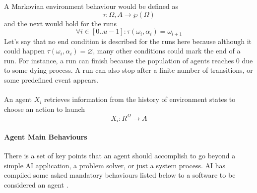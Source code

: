 \documentclass[11pt,oneside,a4paper,openright]{report}
\begin{document}
A Markovian environment behaviour would be defined as
\begin{equation}
	\tau : \Omega,A \longrightarrow \wp(\Omega)
\end{equation}
and the next would hold for the runs
\begin{equation} 
	\forall i \in [0..u-1] : \tau(\omega_i, \alpha_i) = \omega_{i+1}
\end{equation}
Let's say that no end condition is described for the runs here because although it could happen
$\tau(\omega_i, \alpha_i) = \varnothing$, many other conditions could mark the end of a run.
For instance, a run can finish because the population of agents reaches 0 due to some dying process.
A run can also stop after a finite number of transitions, or some predefined event appears.\\
\\
An agent $X_i$ retrieves information from the history of environment states to choose an action to launch
\begin{equation}
	X_i : R^{\Omega} \longrightarrow A 
\end{equation}


\paragraph{Agent Main Behaviours}

There is a set of key points that an agent should accomplish to go beyond a simple AI application, a problem solver, or just a system process. AI has compiled some asked mandatory behaviours listed below to a software to be considered an agent \cite[ch.2]{Wooldridge2002}\cite[ch.1, ch.2]{RussellNorvig}. 
\end{document}
